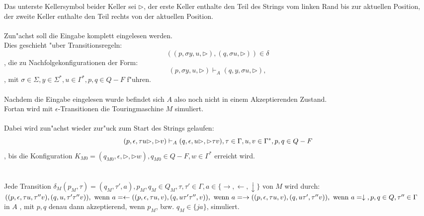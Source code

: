 \documentclass{article}
\newcommand{\da}{\downarrow}
\newcommand{\la}{\leftarrow}
\newcommand{\ra}{\rightarrow}
\newcommand{\eps}{\epsilon}
\newcommand{\s}{\rhd}
\begin{document}
\subsubsection{}
Das unterste Kellersymbol beider Keller sei $\s$, der erste Keller enthalte
    den Teil des Strings vom linken Rand bis zur aktuellen Position, der
    zweite Keller enthalte den Teil rechts von der aktuellen Position.\\
\\
Zun"achst soll die Eingabe komplett eingelesen werden.\\
Dies geschieht "uber Transitionsregeln:\[
    (
        (p, \sigma y, u, \s), 
        (q, \sigma u, \s)
    ) \in \delta
    \]
, die zu Nachfolgekonfigurationen der Form:\[
    (p, \sigma y, u, \s) 
        \vdash_A (q, y, \sigma u, \s),
    \]
, mit $
    \sigma \in \Sigma, y \in \Sigma^*, u \in \Gamma^*, 
    p,q \in Q - F$ f"uhren.\\
\\
Nachdem die Eingabe eingelesen wurde befindet sich $A$ also noch nicht
    in einem Akzeptierenden Zustand.\\
Fortan wird mit $\eps$-Transitionen die Touringmaschine $M$ simuliert.\\
\\
Dabei wird zun"achst wieder zur"uck zum Start des Strings gelaufen:\[
    (p,\eps,\tau u \s, \s v) \vdash_A (q,\eps,u\s,\s \tau v),
    \tau \in \Gamma, u,v \in \Gamma^*, p,q \in Q-F\\
    \]
, bis die Konfiguration 
    $K_{M0} = (q_{M0}, \eps, \s , \s w), q_{M0} \in Q-F, w \in \Gamma^*$
    erreicht wird.\\
\\
\\
Jede Transition
    $\delta_M(p_M,\tau) = (q_M, \tau', a),
    p_M,q_M \in Q_M, \tau, \tau' \in \Gamma, a \in \{\ra,\la,\da\}$
    von $M$ wird durch:\\
$\\
((p, \eps, \tau u, \tau''v), (q, u, \tau' \tau'' v))
    , \text{ wenn } a = \la\\
((p, \eps, \tau u, v), (q, u \tau' \tau'', v))
    , \text{ wenn } a = \ra\\
((p, \eps, \tau u, v), (q, u \tau', \tau'' v))
    , \text{ wenn } a = \da\\
,p,q \in Q, \tau'' \in \Gamma\\
$\\
in $A$ , mit $p,q$ denau dann akzeptierend, wenn $p_M$, bzw. $q_M \in \{ja\}$,
    simuliert.\\
\end{document}
